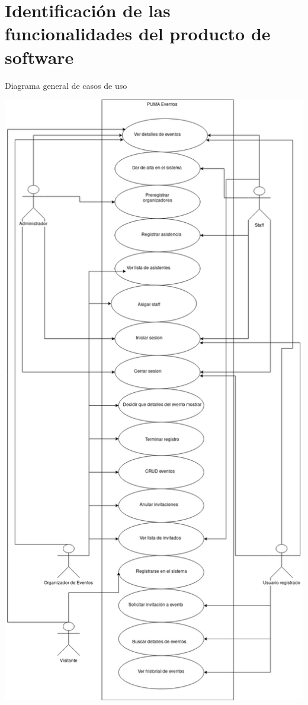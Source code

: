 \documentclass{article}
\begin{document}
\section{Identificación de las funcionalidades del producto de software}
Diagrama general de casos de uso\\
\begin{center}
  \includegraphics[scale=.3]{../imagenes/diagrama_general.png}
\end{center}
\end{document}
